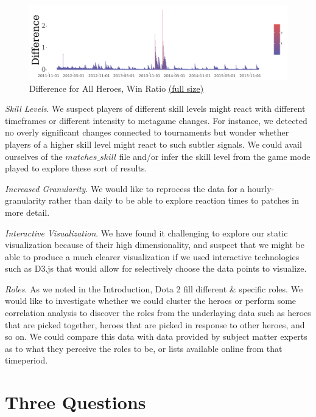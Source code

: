 \begin{figure}[H]
    \centering
    \caption{Difference for All Heroes, Win Ratio \href{https://raw.githubusercontent.com/marcolussetti/opendotadump-tools/master/prints/winratios_differences/poster_winratio_differences_white_15x4.5.png}{(full size)}}
    \label{fig:winratio-differences}
    \includegraphics[width=1\textwidth]{poster_winratio_differences_white_15x45_small.png}
\end{figure}

\emph{Skill Levels}. We suspect players of different skill levels might react with different timeframes or different intensity to metagame changes. For instance, we detected no overly significant changes connected to tournaments but wonder whether players of a higher skill level might react to such subtler signals. We could avail ourselves of the $matches\_skill$ file and/or infer the skill level from the game mode played to explore these sort of results.

\emph{Increased Granularity}. We would like to reprocess the data for a hourly-granularity rather than daily to be able to explore reaction times to patches in more detail.

\emph{Interactive Visualization}. We have found it challenging to explore our static visualization because of their high dimensionality, and suspect that we might be able to produce a much clearer visualization if we used interactive technologies such as D3.js that would allow for selectively choose the data points to visualize.

\emph{Roles}. As we noted in the Introduction, Dota 2 fill different \& specific roles. We would like to investigate whether we could cluster the heroes or perform some correlation analysis to discover the roles from the underlaying data such as heroes that are picked together, heroes that are picked in response to other heroes, and so on. We could compare this data with data provided by subject matter experts as to what they perceive the roles to be, or lists available online from that timeperiod.

\section{Three Questions} %

